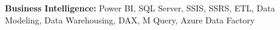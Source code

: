 \textbf{Business Intelligence:} Power BI, SQL Server, SSIS, SSRS, ETL, Data Modeling, Data Warehousing, DAX, M Query, Azure Data Factory
